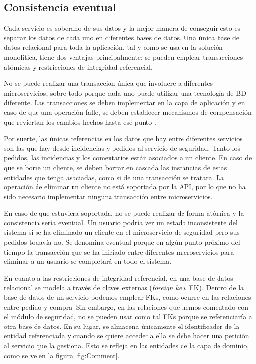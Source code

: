 \documentclass[11pt,spanish,listoffigures]{tfgetsinf}
\begin{document}
\subsection{Consistencia eventual}

Cada servicio es soberano de sus datos y la mejor manera de conseguir esto es separar los datos de cada uno en diferentes bases de datos. Una única base de datos relacional para toda la aplicación, tal y como se usa en la solución monolítica, tiene dos ventajas principalmente: se pueden emplear transacciones atómicas y restricciones de integridad referencial. 

No se puede realizar una transacción única que involucre a diferentes microservicios, sobre todo porque cada uno puede utilizar una tecnología de BD diferente. Las transacciones se deben implementar en la capa de aplicación y en caso de que una operación falle, se deben establecer mecanismos de compensación que reviertan los cambios hechos hasta ese punto \cite{DelaTorre2018}.

Por suerte, las únicas referencias en los datos que hay entre diferentes servicios son las que hay desde incidencias y pedidos al servicio de seguridad. Tanto los pedidos, las incidencias y los comentarios están asociados a un cliente. En caso de que se borre un cliente, se deben borrar en cascada las instancias de estas entidades que tenga asociadas, como si de una transacción se tratara. La operación de eliminar un cliente no está soportada por la API, por lo que no ha sido necesario implementar ninguna transacción entre microservicios.

En caso de que estuviera soportada, no se puede realizar de forma atómica y la consistencia sería eventual. Un usuario podría ver un estado inconsistente del sistema si se ha eliminado un cliente en el microservicio de seguridad pero sus pedidos todavía no. Se denomina eventual porque en algún punto próximo del tiempo la transacción que se ha iniciado entre diferentes microservicios para eliminar a un usuario se completará en todo el sistema.

En cuanto a las restricciones de integridad referencial, en una base de datos relacional se modela a través de claves externas (\textit{foreign key}, FK). Dentro de la base de datos de un servicio podemos emplear FKs, como ocurre en las relaciones entre pedido y compra. Sin embargo, en las relaciones que hemos comentado con el módulo de seguridad, no se pueden usar como tal FKs porque se referenciaría a otra base de datos. En su lugar, se almacena únicamente el identificador de la entidad referenciada y cuando se quiere acceder a ella se debe hacer una petición al servicio que la gestiona. Esto se refleja en las entidades de la capa de dominio, como se ve en la figura \ref{fig:Comment}.
\end{document}
